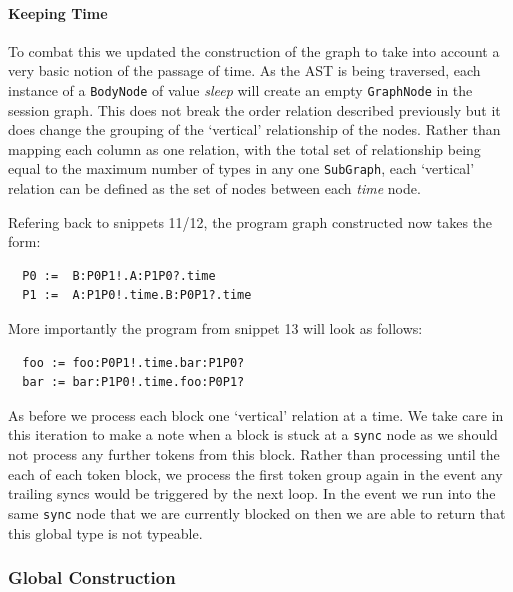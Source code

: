 \documentclass[11pt]{scrartcl}
\begin{document}
\paragraph{Keeping Time}
To combat this we updated the construction of the graph to take into account
a very basic notion of the passage of time. As the AST is being traversed, each
instance of a \texttt{BodyNode} of value \emph{sleep} will create an empty
\texttt{GraphNode} in the session graph. This does not break the order relation
described previously but it does change the grouping of the `vertical' 
relationship of the nodes. Rather than mapping each column as one relation, with
the total set of relationship being equal to the maximum number of types in
any one \texttt{SubGraph}, each `vertical' relation can be defined as the
set of nodes between each \emph{time} node.


Refering back to snippets 11/12, the program graph constructed now takes
the form:
\\
\begin{lstlisting}
  P0 :=  B:P0P1!.A:P1P0?.time
  P1 :=  A:P1P0!.time.B:P0P1?.time
\end{lstlisting}

More importantly the program from snippet 13 will look as follows:
\\
\begin{lstlisting}
  foo := foo:P0P1!.time.bar:P1P0?
  bar := bar:P1P0!.time.foo:P0P1?
\end{lstlisting}

As before we process each block one `vertical' relation at a time. We take
care in this iteration to make a note when a block is stuck at a \texttt{sync}
node as we should not process any further tokens from this block. Rather than
processing until the each of each token block, we process the first token group
again in the event any trailing syncs would be triggered by the next loop. In
the event we run into the same \texttt{sync} node that we are currently blocked
on then we are able to return that this global type is not typeable.


\subsubsection{Global Construction}


\end{document}
